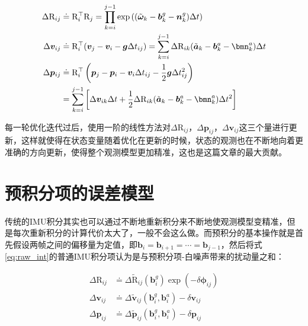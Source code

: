 \begin{equation}
\begin{aligned}
    \Delta\mathrm{R}_{ij}
  &\doteq \mathrm{R}_i^\top \mathrm{R}_j
  = \prod_{k=i}^{j-1}
  \exp\left(
      (\tilde{\bm \omega}_k - \bm{b}_k^g - \bm{n}_k^g) \Delta t
  \right) \\
  \Delta\bm{v}_{ij}
  &\doteq \mathrm{R}_i^\top (\bm{v}_j - \bm{v}_i - \bm{g} \Delta t_{ij})
  = \sum_{k=i}^{j-1}
  \Delta\mathrm{R}_{ik}
  (\tilde{\bm a}_k - \bm{b}_k^a - \bmn_k^a) \Delta t \\
  \Delta\bm{p}_{ij}
  &\doteq \mathrm{R}_i^\top
  \left(
      \bm{p}_j - \bm{p}_i -
      \bm{v}_i \Delta t_{ij} -
      \frac{1}{2} \bm{g} \Delta t_{ij}^2
  \right) \\
  &=           \sum_{k=i}^{j-1}
  \left[
      \Delta\bm{v}_{ik} \Delta t +
      \frac{1}{2} \Delta\mathrm{R}_{ik}
      (\tilde{\bm a}_k - \bm{b}_k^a - \bmn_k^a) \Delta t^2
  \right]
\end{aligned}\label{eq:raw_int}
\end{equation}

每一轮优化迭代过后，使用一阶的线性方法对$\Delta\mathrm{R}_{ij}$，$\Delta\bm{p}_{ij}$，$\Delta\bm{v}_{ij}$这三个量进行更新，这样就使得在状态变量随着优化在更新的时候，状态的观测也在不断地向着更准确的方向更新，使得整个观测模型更加精准，这也是这篇文章的最大贡献。

\section{预积分项的误差模型}

传统的IMU积分其实也可以通过不断地重新积分来不断地使观测模型变精准，但是每次重新积分的计算代价太大了，一般不会这么做。而预积分的基本操作就是首先假设两帧之间的偏移量为定值，即$\bm{b}_i = \bm{b}_{i+1} = \cdots = \bm{b}_{j-1}$，然后将式\eqref{eq:raw_int}的普通IMU积分项认为是与预积分项-白噪声带来的扰动量之和：

\begin{equation}
\begin{aligned}
    \Delta\mathrm{R}_{ij} &\doteq
        \Delta\tilde{\mathrm R}_{ij}(\bm{b}^g_i) \exp(-\delta\bm\phi_{ij}) \\
    \Delta\bm{v}_{ij} &\doteq
        \Delta\tilde{\bm v}_{ij}(\bm{b}^g_i, \bm{b}^a_i) - \delta\bm{v}_{ij} \\
    \Delta\bm{p}_{ij} &\doteq
        \Delta\tilde{\bm p}_{ij}(\bm{b}^g_i, \bm{b}^a_i) - \delta\bm{p}_{ij}
\end{aligned}
\end{equation}


